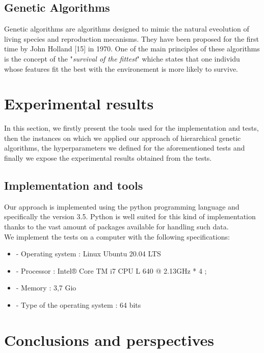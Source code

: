 \documentclass[twocolumn,10pt]{asme2ej}
\begin{document}
\subsection{Genetic Algorithms}
Genetic algorithms are algorithms designed to mimic the natural eveolution of living species and reproduction mecanisms. They have been proposed for the first time by John Holland [15] in 1970. One of the main principles of these algorithms is the concept of the "\emph{survival of the fittest}" whiche states that one individu whose features fit the best with the environement is more likely to survive. 

\section{Experimental results \protect\footnotemark}

In this section, we firstly present the tools used for the implementation and tests, then the instances on which we applied our approach of hierarchical genetic algorithms, the hyperparameters we defined for the aforementioned tests and finally we expose the experimental results obtained from the tests.

\subsection{Implementation and tools}

Our approach is implemented using the python programming language and specifically the version 3.5. Python is well suited for this kind of implementation thanks to the vast amount of packages available for handling such data.\\
We implement the tests on a computer with the following specifications:
\begin{itemize}
    \item - Operating system : Linux Ubuntu 20.04 LTS
    \item - Processor : Intel® Core TM i7 CPU L 640 @ 2.13GHz * 4 ;
    \item - Memory : 3,7 Gio
    \item - Type of the operating system : 64 bits
\end{itemize}

\section{Conclusions and perspectives}
\end{document}
